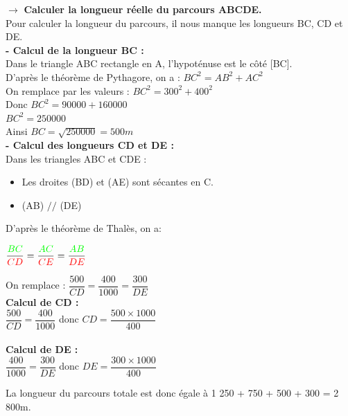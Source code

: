 \documentclass[a4paper,11pt]{article}
\newcommand{\bi}{\begin{itemize}}
\newcommand{\ei}{\end{itemize}}
\begin{document}
$\rightarrow$ \textbf{ Calculer la longueur réelle du parcours ABCDE.}\\


\color{red}
Pour calculer la longueur du parcours, il nous manque les longueurs BC, CD et DE.\\

\textbf{- Calcul de la longueur BC :}\\

Dans le triangle ABC rectangle en A, l'hypoténuse est le côté [BC].\\

D'après le théorème de Pythagore, on a : \hspace*{1cm} $BC^{2}=AB^{2}+AC^{2}$\\

On remplace par les valeurs : $BC^{2}=300^{2}+400^{2}$\\

Donc  $BC^{2}=90 000+160 000$\\

 $BC^{2}=250 000$\\
 
  Ainsi  $BC= \sqrt{250 000}=500 m$\\ 


\textbf{- Calcul des longueurs CD et DE :}\\



Dans les triangles ABC et CDE :
\bi
\item Les droites (BD) et (AE) sont sécantes en C.
\item (AB) $\slash\slash$ (DE)
\ei

D'après le théorème de Thalès, on a:

\begin{center}
$\dfrac{\textcolor{green}{BC}}{\textcolor{red}{CD}}=\dfrac{\textcolor{green}{AC}}{\textcolor{red}{CE}}=\dfrac{\textcolor{green}{AB}}{\textcolor{red}{DE}}$\\
\end{center}
 



On remplace : \hspace*{1cm} $\dfrac{500}{CD}=\dfrac{400}{1000}=\dfrac{300}{DE}$\\


\textbf{Calcul de CD :}\\

$\dfrac{500}{CD}=\dfrac{400}{1000}$ donc $CD = \dfrac{500 \times 1000}{400}$\\

 \\

\textbf{Calcul de DE :}\\

$\dfrac{400}{1000}=\dfrac{300}{DE}$ donc $DE = \dfrac{300 \times 1000}{400}$\\


La longueur du parcours totale est donc égale à 1 250 + 750 + 500 + 300 = 2 800m.\\

\color{black}
\end{document}
